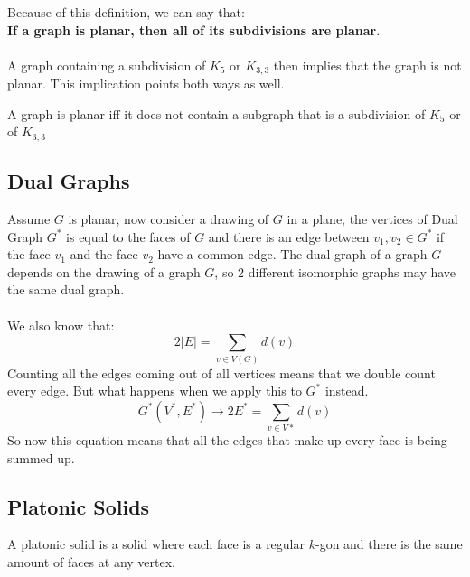 \documentclass[12pt]{article}
\begin{document}
Because of this definition, we can say that:\\
\textbf{If a graph is planar, then all of its subdivisions are planar}.\\
\\
A graph containing a subdivision of $K_5$ or $K_{3,3}$ then implies that the graph is not planar. This implication points both ways as well.

\begin{tcolorbox}[title=Kuratowski's Theorem]
	A graph is planar iff it does not contain a subgraph that is a subdivision of $K_5$ or of $K_{3,3}$
\end{tcolorbox}

\subsection{Dual Graphs}

Assume $G$ is planar, now consider a drawing of $G$ in a plane, the vertices of Dual Graph $G^*$ is equal to the faces of $G$ and there is an edge between $v_1, v_2 \in G^*$ if the face $v_1$ and the face $v_2$ have a common edge. The dual graph of a graph $G$ depends on the drawing of a graph $G$, so 2 different isomorphic graphs may have the same dual graph.\\
\\
We also know that: 
$$2|E| = \sum_{v \in V(G)} d(v)$$
Counting all the edges coming out of all vertices means that we double count every edge. But what happens when we apply this to $G^*$ instead.
$$G^*(V^*, E^*) \longrightarrow 2E^* = \sum_{v \in V*} d(v)$$
So now this equation means that all the edges that make up every face is being summed up.

\subsection{Platonic Solids}
A platonic solid is a solid where each face is a regular $k$-gon and there is the same amount of faces at any vertex.
\end{document}
